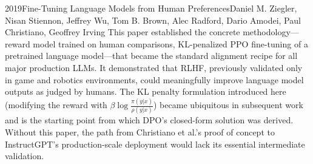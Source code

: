 \begin{papersummary}{2019}{Fine-Tuning Language Models from Human Preferences}{Daniel M. Ziegler, Nisan Stiennon, Jeffrey Wu, Tom B. Brown, Alec Radford, Dario Amodei, Paul Christiano, Geoffrey Irving}
This paper established the concrete methodology---reward model trained on human comparisons, KL-penalized PPO fine-tuning of a pretrained language model---that became the standard alignment recipe for all major production LLMs. It demonstrated that RLHF, previously validated only in game and robotics environments, could meaningfully improve language model outputs as judged by humans. The KL penalty formulation introduced here (modifying the reward with $\beta \log \frac{\pi(y|x)}{\rho(y|x)}$) became ubiquitous in subsequent work and is the starting point from which DPO's closed-form solution was derived. Without this paper, the path from Christiano et al.'s proof of concept to InstructGPT's production-scale deployment would lack its essential intermediate validation.

\end{papersummary}
